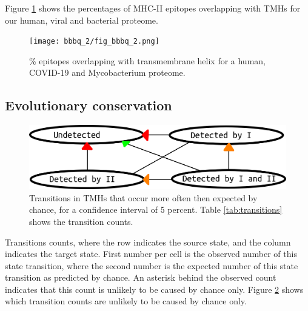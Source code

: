 Figure \ref{fig:2} shows the percentages of MHC-II epitopes overlapping 
with TMHs for our human, viral and bacterial proteome.

\begin{figure}[!htbp]
  \texttt{[image: bbbq\_2/fig\_bbbq\_2.png]}
  \caption{
    \% epitopes overlapping with transmembrane helix
    for a human, COVID-19 and Mycobacterium proteome.
  }
  \label{fig:2}
\end{figure}

\subsection{Evolutionary conservation}

\begin{figure}[!htbp]
  \includegraphics[width=\textwidth]{transitions.png}
  \caption{
    Transitions in TMHs that occur more often then expected by chance,
    for a confidence interval of 5 percent.
    Table \ref{tab:transitions} shows the transition counts.
  }
  \label{fig:transitions}
\end{figure}

\begin{table}[!htbp]
  
  \caption{
    Transitions counts, where the row indicates the source state,
    and the column indicates the target state.
    First number per cell is the observed number of this state transition,
    where the second number is the expected number of this state transition
    as predicted by chance.
    An asterisk behind the observed count indicates that this count
    is unlikely to be caused by chance only.
    Figure \ref{fig:transitions} shows which transition counts are 
    unlikely to be caused by chance only.
  }
  \label{tab:transitions}
\end{table}

